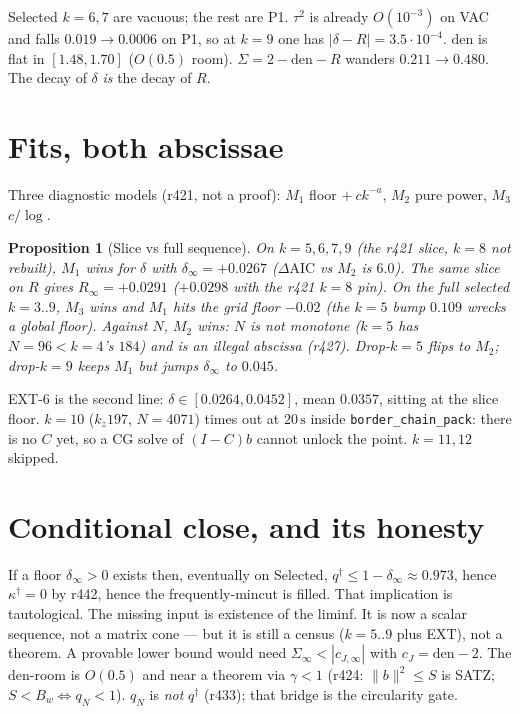 \documentclass[11pt]{article}
\newtheorem{prop}{Proposition}
\newcommand{\qd}{q^{\dagger}}
\newcommand{\kapd}{\kappa^{\dagger}}
\begin{document}
Selected $k=6,7$ are vacuous; the rest are P1.
$\tau^{2}$ is already $O(10^{-3})$ on VAC and falls
$0.019\to 0.0006$ on P1, so at $k=9$ one has
$|\delta-R|=3.5\cdot 10^{-4}$.
$\mathrm{den}$ is flat in $[1.48,1.70]$
($O(0.5)$ room).
$\Sigma=2-\mathrm{den}-R$ wanders $0.211\to 0.480$.
The decay of $\delta$ \emph{is} the decay of $R$.

\section{Fits, both abscissae}\label{sec:aic}

Three diagnostic models (r421, not a proof):
$M_1$ floor $+\ ck^{-a}$, $M_2$ pure power, $M_3$
$c/\log$.

\begin{prop}[Slice vs full sequence]\label{prop:aic}
On $k=5,6,7,9$ (the r421 slice, $k=8$ not rebuilt),
$M_1$ wins for $\delta$ with
$\delta_{\infty}=+0.0267$
($\Delta\mathrm{AIC}$ vs $M_2$ is $6.0$).
The same slice on $R$ gives $R_{\infty}=+0.0291$
($+0.0298$ with the r421 $k=8$ pin).
On the full selected $k=3..9$, $M_3$ wins and $M_1$
hits the grid floor $-0.02$ (the $k=5$ bump $0.109$
wrecks a global floor).
Against $N$, $M_2$ wins: $N$ is not monotone
($k=5$ has $N=96<k=4$'s $184$) and is an illegal
abscissa (r427).
Drop-$k=5$ flips to $M_2$; drop-$k=9$ keeps $M_1$
but jumps $\delta_{\infty}$ to $0.045$.
\end{prop}

EXT-6 is the second line:
$\delta\in[0.0264,0.0452]$, mean $0.0357$, sitting
at the slice floor.
$k=10$ ($k_z197$, $N=4071$) times out at $20\,\mathrm{s}$
inside \texttt{border\_chain\_pack}: there is no
$C$ yet, so a CG solve of $(I-C)b$ cannot unlock the
point.  $k=11,12$ skipped.

\section{Conditional close, and its honesty}\label{sec:cond}

If a floor $\delta_{\infty}>0$ exists then, eventually
on Selected,
$\qd\le 1-\delta_{\infty}\approx 0.973$,
hence $\kapd=0$ by r442, hence the frequently-mincut
is filled.
That implication is tautological.
The missing input is existence of the liminf.
It is now a scalar sequence, not a matrix cone ---
but it is still a census ($k=5..9$ plus EXT), not a
theorem.
A provable lower bound would need
$\Sigma_{\infty}<|c_{J,\infty}|$ with
$c_J=\mathrm{den}-2$.
The $\mathrm{den}$-room is $O(0.5)$ and near a
theorem via $\gamma<1$ (r424:
$\lVert b\rVert^{2}\le S$ is SATZ;
$S<B_w\Leftrightarrow q_N<1$).
$q_N$ is \emph{not} $\qd$ (r433); that bridge is
the circularity gate.
\end{document}
